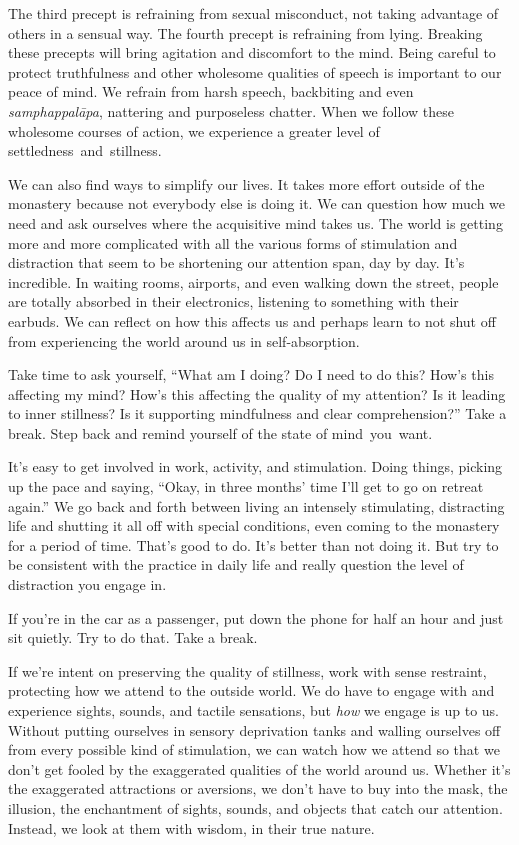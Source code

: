 The third precept is refraining from sexual misconduct, not taking advantage of others in a sensual way. The fourth precept is refraining from lying. Breaking these precepts will bring agitation and discomfort to the mind. Being careful to protect truthfulness and other wholesome qualities \linebreak of speech is important to our peace of mind. We refrain from harsh speech, backbiting and even \emph{samphappalāpa}, nattering and purposeless chatter. When we follow these wholesome courses of action, we experience a greater level of \mbox{settledness and stillness.}

We can also find ways to simplify our lives. It takes more effort outside of the monastery because not everybody else is doing it. We can question how much we need and ask ourselves where the acquisitive mind takes us. The world is getting more and more complicated with all the various forms of stimulation and distraction that seem to be shortening our attention span, day by day. It's incredible. In waiting rooms, airports, and even walking down the street, people are totally absorbed in their electronics, listening to something with their earbuds. We can reflect on how this affects us and perhaps learn to not shut off from experiencing the world around us in self-absorption.

Take time to ask yourself, ``What am I doing? Do I need to do this? How's this affecting my mind? How's this affecting the quality of my attention? Is it leading to inner stillness? Is it supporting mindfulness and clear comprehension?'' Take a break. Step back and remind yourself of the state of \mbox{mind you want.}

It's easy to get involved in work, activity, and stimulation. Doing things, picking up the pace and saying, ``Okay, in three months' time I'll get to go on retreat again.'' We go back and forth between living an intensely stimulating, distracting life and shutting it all off with special conditions, even coming to the monastery for a period of time. That's good to do. It's better than not doing it. But try to be consistent with the practice in daily life and really question the level of distraction you engage in.

If you're in the car as a passenger, put down the phone for half an hour and just sit quietly. Try to do that. Take a break.

If we're intent on preserving the quality of stillness, work with sense restraint, protecting how we attend to the outside world. We do have to engage with and experience sights, sounds, and tactile sensations, but \emph{how} we engage is up to us. Without putting ourselves in sensory deprivation tanks and walling ourselves off from every possible kind of stimulation, we can watch how we attend so that we don't get fooled by the exaggerated qualities of the world around us. Whether it's the exaggerated attractions or aversions, we don't have to buy into the mask, the illusion, the enchantment of sights, sounds, and objects that catch our attention. Instead, we look at them with wisdom, in their true nature.

